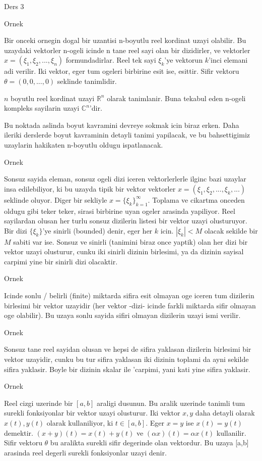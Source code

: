 \documentclass[12pt,fleqn]{article}
\begin{document}
Ders 3

Ornek 

Bir onceki ornegin dogal bir uzantisi n-boyutlu reel kordinat uzayi
olabilir. Bu uzaydaki vektorler n-ogeli icinde n tane reel sayi olan bir
dizidirler, ve vektorler $x = (\xi_1, \xi_2,...,\xi_n)$
formundadirlar. Reel tek sayi $\xi_k$'ye vektorun $k$'inci elemani adi
verilir. Iki vektor, eger tum ogeleri birbirine esit ise, esittir. Sifir
vektoru $\theta = (0,0,...,0)$ seklinde tanimlidir. 

$n$ boyutlu reel kordinat uzayi $\mathbb{R}^n$ olarak tanimlanir. Buna tekabul eden
n-ogeli kompleks sayilarin uzayi $\mathbb{C}^n$'dir. 

Bu noktada aslinda boyut kavramini devreye sokmak icin biraz erken. Daha
ileriki derslerde boyut kavraminin detayli tanimi yapilacak, ve bu
bahsettigimiz uzaylarin hakikaten n-boyutlu oldugu ispatlanacak. 

Ornek 

Sonsuz sayida eleman, sonsuz ogeli dizi iceren vektorlerlerle ilginc bazi
uzaylar insa edilebiliyor, ki bu uzayda tipik bir vektor vektorler 
$x =
(\xi_1, \xi_2,...,\xi_k,...)$ seklinde oluyor. Diger bir sekliyle $x =
\{\xi_k\} _{k=1}^{\infty}$. 
Toplama ve cikartma onceden oldugu gibi teker teker, sirasi birbirine uyan
ogeler arasinda yapiliyor. Reel sayilardan olusan her turlu sonsuz
dizilerin listesi bir vektor uzayi olusturuyor. Bir dizi $\{\xi_k\}$'ye
sinirli (bounded) denir, eger her $k$ icin.  $|\xi_k| < M$ olacak sekilde
bir $M$ sabiti var ise. Sonsuz ve sinirli (tanimini biraz once yaptik) olan 
her dizi bir vektor uzayi olusturur, cunku iki sinirli dizinin birlesimi, ya
da dizinin sayisal carpimi yine bir sinirli dizi olacaktir. 

Ornek 

Icinde sonlu / belirli (finite) miktarda sifira esit olmayan oge iceren tum
dizilerin birlesimi bir vektor uzayidir (her vektor -dizi- icinde farkli
miktarda sifir olmayan oge olabilir). Bu uzaya sonlu sayida sifiri olmayan
dizilerin uzayi ismi verilir. 

Ornek

Sonsuz tane reel sayidan olusan ve hepsi de sifira yaklasan dizilerin
birlesimi bir vektor uzayidir, cunku bu tur sifira yaklasan iki dizinin
toplami da ayni sekilde sifira yaklasir. Boyle bir dizinin skalar ile
'carpimi, yani kati yine sifira yaklasir. 

Ornek 

Reel cizgi uzerinde bir $[a,b]$ araligi dusunun. Bu aralik uzerinde tanimli
tum surekli fonksiyonlar bir vektor uzayi olusturur. Iki vektor $x,y$ daha
detayli olarak $x(t),y(t)$ olarak kullaniliyor, ki $t \in [a,b]$. Eger $x =
y$ ise 
$x(t) = y(t)$ demektir. $(x+y)(t) = x(t) + y(t)$ ve $(\alpha x)(t) =
\alpha x(t)$ kullanilir. 
Sifir vektoru $\theta$ bu aralikta surekli sifir degerinde olan vektordur. 
Bu uzaya [a,b] arasinda reel degerli surekli fonksiyonlar uzayi denir. 
\end{document}
